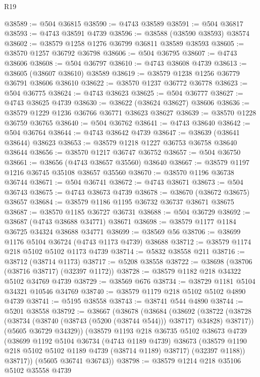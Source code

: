 \begin{lexlean}{R19}
\begin{coremodule}
{{{{{{{{{{{@38589 := @504 @36815
@38590 := @4743 @38589
@38591 := @504 @36817
@38593 := @4743 @38591 @4739
@38596 := @38588 (@38590 @38593) @38574
@38602 := @38579 @1258 @1276 @36799 @36811 @38589 @38593
@38605 := @38570 @1257 @36792 @36798
@38606 := @504 @36795
@38607 := @4743 @38606
@38608 := @504 @36797
@38610 := @4743 @38608 @4739
@38613 := @38605 (@38607 @38610) @38589
@38619 := @38579 @1238 @1256 @36779 @36791 @38606 @38610
@38622 := @38570 @1237 @36772 @36778
@38623 := @504 @36775
@38624 := @4743 @38623
@38625 := @504 @36777
@38627 := @4743 @38625 @4739
@38630 := @38622 (@38624 @38627) @38606
@38636 := @38579 @1229 @1236 @36766 @36771 @38623 @38627
@38639 := @38570 @1228 @36759 @36765
@38640 := @504 @36762
@38641 := @4743 @38640
@38642 := @504 @36764
@38644 := @4743 @38642 @4739
@38647 := @38639 (@38641 @38644) @38623
@38653 := @38579 @1218 @1227 @36753 @36758 @38640 @38644
@38656 := @38570 @1217 @36747 @36752
@38657 := @504 @36750
@38661 := @38656 (@4743 @38657 @35560) @38640
@38667 := @38579 @1197 @1216 @36745 @35108 @38657 @35560
@38670 := @38570 @1196 @36738 @36744
@38671 := @504 @36741
@38672 := @4743 @38671
@38673 := @504 @36743
@38675 := @4743 @38673 @4739
@38678 := @38670 (@38672 @38675) @38657
@38684 := @38579 @1186 @1195 @36732 @36737 @38671 @38675
@38687 := @38570 @1185 @36727 @36731
@38688 := @504 @36729
@38692 := @38687 (@4743 @38688 @34771) @38671
@38698 := @38579 @1177 @1184 @36725 @34324 @38688 @34771
@38699 := @38569 @56
@38706 := @38699 @1176 @5104 @36724 (@4743 @1173 @4739) @38688
@38712 := @38579 @1174 @218 @5102 @5102 @1173 @4739
@38714 := @5832 @38558 @211
@38716 := @38712 (@38714 @1173)
@38717 := @5208 @38558
@38722 := @38698 (@38706 (@38716 @38717) (@32397 @1172))
@38728 := @38579 @1182 @218 @34322 @5102 @34769 @4739
@38729 := @38569 @676
@38734 := @38729 @1181 @5104 @34321 @10546 @34769
@38740 := @38579 @1179 @218 @5102 @5102 @4890 @4739
@38741 := @5195 @38558
@38743 := @38741 @544 @4890
@38744 := @5201 @38558
@38792 := @38667
    (@38678
      (@38684
        (@38692
          (@38722 (@38728 (@38734 (@38740 (@38743 (@5200 (@38744 @544))) @38717) @34828) @38717))
          (@5605 @36729 @34329))
        (@38579
          @1193
          @218
          @36735
          @5102
          @38673
          @4739
          (@38699
            @1192
            @5104
            @36734
            (@4743 @1189 @4739)
            @38673
            (@38579 @1190 @218 @5102 @5102 @1189 @4739 (@38714 @1189) @38717)
            (@32397 @1188))
          @38717))
      (@5605 @36741 @36743))
@38798 := @38579 @1214 @218 @35106 @5102 @35558 @4739
}}}}}}}}}}}
\end{coremodule}
\end{lexlean}
